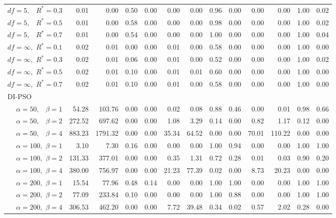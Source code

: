 \documentclass[12pt]{article}
\begin{document}
\begin{appendix}
\begin{table}[ht]
{\begin{tabular}{r|rrrr|rrrr|rrrr}
  $df = 5,\enspace$ $R^* =0.3$ & 0.01 & 0.00 & 0.50 & 0.00 & 0.00 & 0.00 & 0.96 & 0.00 & 0.00 & 0.00 & 1.00 & 0.02 \\ 
  $df = 5,\enspace$ $R^* =0.5$ & 0.01 & 0.00 & 0.58 & 0.00 & 0.00 & 0.00 & 0.98 & 0.00 & 0.00 & 0.00 & 1.00 & 0.02 \\ 
  $df = 5,\enspace$ $R^* =0.7$ & 0.01 & 0.00 & 0.54 & 0.00 & 0.00 & 0.00 & 1.00 & 0.00 & 0.00 & 0.00 & 1.00 & 0.04 \\ 
  $df = \infty,$ $R^* =0.1$ & 0.02 & 0.01 & 0.00 & 0.00 & 0.01 & 0.00 & 0.58 & 0.00 & 0.00 & 0.00 & 1.00 & 0.00 \\ 
  $df = \infty,$ $R^* =0.3$ & 0.02 & 0.01 & 0.06 & 0.00 & 0.01 & 0.00 & 0.52 & 0.00 & 0.00 & 0.00 & 1.00 & 0.02 \\ 
  $df = \infty,$ $R^* =0.5$ & 0.02 & 0.01 & 0.10 & 0.00 & 0.01 & 0.01 & 0.60 & 0.00 & 0.00 & 0.00 & 1.00 & 0.00 \\ 
  $df = \infty,$ $R^* =0.7$ & 0.02 & 0.01 & 0.10 & 0.00 & 0.01 & 0.00 & 0.58 & 0.00 & 0.00 & 0.00 & 1.00 & 0.00 \\ 
\hline
\multicolumn{1}{l|}{DI-PSO} &&&&&&&&&&&&\\
  $\alpha = 50,\enspace$ $\beta =1$ & 54.28 & 103.76 & 0.00 & 0.00 & 0.02 & 0.08 & 0.88 & 0.46 & 0.00 & 0.01 & 0.98 & 0.66 \\ 
  $\alpha = 50,\enspace$ $\beta =2$ & 272.52 & 697.62 & 0.00 & 0.00 & 1.08 & 3.29 & 0.14 & 0.00 & 0.82 & 1.17 & 0.12 & 0.00 \\ 
  $\alpha = 50,\enspace$ $\beta =4$ & 883.23 & 1791.32 & 0.00 & 0.00 & 35.34 & 64.52 & 0.00 & 0.00 & 70.01 & 110.22 & 0.00 & 0.00 \\ 
  $\alpha = 100,$ $\beta =1$ & 3.10 & 7.30 & 0.16 & 0.00 & 0.00 & 0.00 & 1.00 & 0.94 & 0.00 & 0.00 & 1.00 & 1.00 \\ 
  $\alpha = 100,$ $\beta =2$ & 131.33 & 377.01 & 0.00 & 0.00 & 0.35 & 1.31 & 0.72 & 0.28 & 0.01 & 0.03 & 0.90 & 0.20 \\ 
  $\alpha = 100,$ $\beta =4$ & 380.00 & 756.97 & 0.00 & 0.00 & 21.23 & 77.39 & 0.02 & 0.00 & 8.73 & 20.23 & 0.00 & 0.00 \\ 
  $\alpha = 200,$ $\beta =1$ & 15.54 & 77.96 & 0.48 & 0.14 & 0.00 & 0.00 & 1.00 & 1.00 & 0.00 & 0.00 & 1.00 & 1.00 \\ 
  $\alpha = 200,$ $\beta =2$ & 77.09 & 233.84 & 0.10 & 0.00 & 0.00 & 0.00 & 1.00 & 0.88 & 0.00 & 0.00 & 1.00 & 1.00 \\ 
  $\alpha = 200,$ $\beta =4$ & 306.53 & 462.20 & 0.00 & 0.00 & 7.72 & 39.48 & 0.34 & 0.02 & 0.57 & 2.02 & 0.28 & 0.00 \\ 

\end{tabular}}
\end{table}
\end{appendix}
\end{document}
